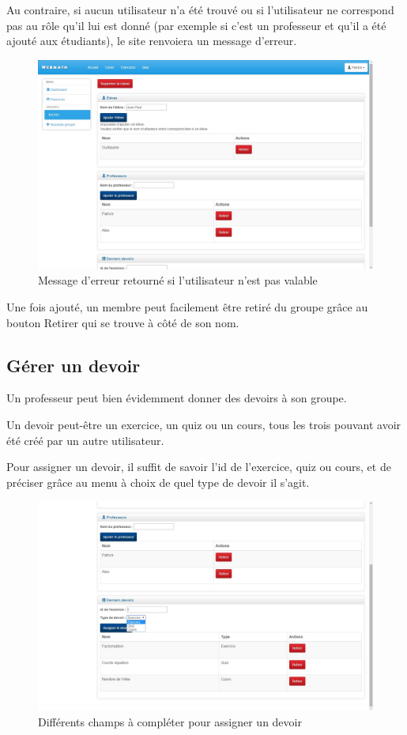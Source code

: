 \documentclass[letterpaper,10pt,french]{sphinxmanual}
\begin{document}
Au contraire, si aucun utilisateur n'a été trouvé ou si l'utilisateur ne
correspond pas au rôle qu'il lui est donné (par exemple si c'est un
professeur et qu'il a été ajouté aux étudiants), le site renvoiera un message
d'erreur.
\begin{figure}[htbp]
\centering
\capstart

\includegraphics[width=0.600\linewidth]{classAjouterMembresEchec.jpg}
\caption{Message d'erreur retourné si l'utilisateur n'est pas valable}\end{figure}

Une fois ajouté, un membre peut facilement être retiré du groupe grâce au bouton
Retirer qui se trouve à côté de son nom.


\subsection{Gérer un devoir}
\label{dashboard:gerer-un-devoir}
Un professeur peut bien évidemment donner des devoirs à son groupe.

Un devoir peut-être un exercice, un quiz ou un cours, tous les trois
pouvant avoir été créé par un autre utilisateur.

Pour assigner un devoir, il suffit de savoir l'id de l'exercice, quiz ou cours,
et de préciser grâce au menu à choix de quel type de devoir il s'agit.
\begin{figure}[htbp]
\centering
\capstart

\includegraphics[width=0.600\linewidth]{classDevoir.jpg}
\caption{Différents champs à compléter pour assigner un devoir}\end{figure}
\end{document}
